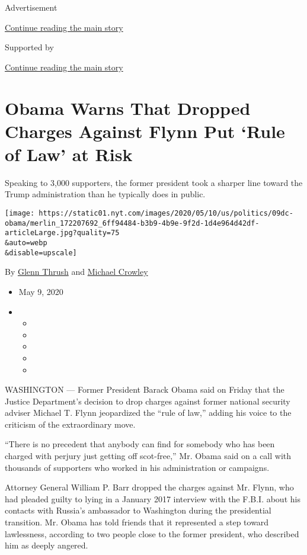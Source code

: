Advertisement

\protect\hyperlink{after-top}{Continue reading the main story}

Supported by

\protect\hyperlink{after-sponsor}{Continue reading the main story}

\hypertarget{obama-warns-that-dropped-charges-against-flynn-put-rule-of-law-at-risk}{%
\section{Obama Warns That Dropped Charges Against Flynn Put `Rule of
Law' at
Risk}\label{obama-warns-that-dropped-charges-against-flynn-put-rule-of-law-at-risk}}

Speaking to 3,000 supporters, the former president took a sharper line
toward the Trump administration than he typically does in public.

\texttt{[image: https://static01.nyt.com/images/2020/05/10/us/politics/09dc-obama/merlin\_172207692\_6ff94484-b3b9-4b9e-9f2d-1d4e964d42df-articleLarge.jpg?quality=75\\\&auto=webp\\\&disable=upscale]}

By \href{https://www.nytimes.com/by/glenn-thrush}{Glenn Thrush} and
\href{https://www.nytimes.com/by/michael-crowley}{Michael Crowley}

\begin{itemize}
\item
  May 9, 2020
\item
  \begin{itemize}
  \item
  \item
  \item
  \item
  \item
  \end{itemize}
\end{itemize}

WASHINGTON --- Former President Barack Obama said on Friday that the
Justice Department's decision to drop charges against former national
security adviser Michael T. Flynn jeopardized the ``rule of law,''
adding his voice to the criticism of the extraordinary move.

``There is no precedent that anybody can find for somebody who has been
charged with perjury just getting off scot-free,'' Mr. Obama said on a
call with thousands of supporters who worked in his administration or
campaigns.

Attorney General William P. Barr dropped the charges against Mr. Flynn,
who had pleaded guilty to lying in a January 2017 interview with the
F.B.I. about his contacts with Russia's ambassador to Washington during
the presidential transition. Mr. Obama has told friends that it
represented a step toward lawlessness, according to two people close to
the former president, who described him as deeply angered.

